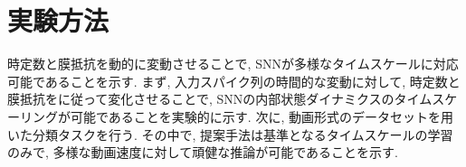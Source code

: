 \section{実験方法}
時定数と膜抵抗を動的に変動させることで, SNNが多様なタイムスケールに対応可能であることを示す.
まず, 入力スパイク列の時間的な変動に対して, 時定数と膜抵抗をに従って変化させることで, SNNの内部状態ダイナミクスのタイムスケーリングが可能であることを実験的に示す.
次に, 動画形式のデータセットを用いた分類タスクを行う.
その中で, 提案手法は基準となるタイムスケールの学習のみで, 多様な動画速度に対して頑健な推論が可能であることを示す.


% 